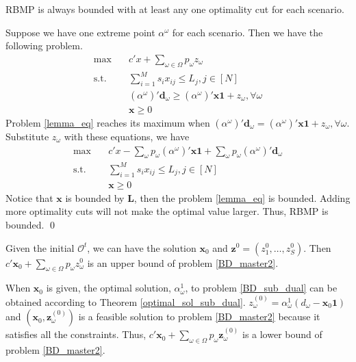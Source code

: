 \begin{lem}\label{one_ep_feasible}
RBMP is always bounded with at least any one optimality cut for each scenario.
\end{lem}

\begin{pf}
  Suppose we have one extreme point $\alpha^{\omega}$ for each scenario. Then we have the following problem.
  \begin{equation}\label{lemma_eq}
    \begin{aligned}
      \max \quad & c{'} x + \sum_{\omega \in \Omega} p_{\omega} z_{\omega} \\
      \text {s.t.} \quad & \sum_{i=1}^{M} s_{i} x_{ij} \leq L_j, j \in [N] \\
      & (\alpha^{\omega}){'}\mathbf{d}_{\omega} \geq (\alpha^{\omega}){'} \mathbf{x} \mathbf{1} + z_{\omega}, \forall \omega \\
       & \mathbf{x} \geq 0
    \end{aligned}
  \end{equation}
  Problem \eqref{lemma_eq} reaches its maximum when $(\alpha^{\omega}){'}\mathbf{d}_{\omega} = (\alpha^{\omega}){'} \mathbf{x} \mathbf{1} + z_{\omega}, \forall \omega$. Substitute $z_{\omega}$ with these equations, we have 
  \begin{equation}\label{lemma_eq2}
    \begin{aligned}
      \max \quad & c{'} x - \sum_{\omega}p_{\omega}(\alpha^{\omega}){'} \mathbf{x} \mathbf{1} + \sum_{\omega} p_{\omega} (\alpha^{\omega}){'} \mathbf{d}_{\omega} \\
      \text {s.t.} \quad & \sum_{i=1}^{M} s_{i} x_{ij} \leq L_j, j \in [N] \\
      & \mathbf{x} \geq 0
    \end{aligned}
  \end{equation}
  Notice that $\mathbf{x}$ is bounded by $\mathbf{L}$, then the problem \eqref{lemma_eq} is bounded. Adding more optimality cuts will not make the optimal value larger. Thus, RBMP is bounded. 
  \qed
\end{pf}

Given the initial $\mathcal{O}^{t}$, we can have the solution $\mathbf{x}_{0}$ and $\mathbf{z}^{0} =(z^{0}_1,\ldots, z^{0}_S)$. Then $c{'} \mathbf{x}_0 + \sum_{\omega \in \Omega} p_{\omega} z_{\omega}^{0}$ is an upper bound of problem \eqref{BD_master2}. 


When $\mathbf{x}_0$ is given, the optimal solution, $\alpha_{\omega}^{1}$, to problem \eqref{BD_sub_dual} can be obtained according to Theorem \ref{optimal_sol_sub_dual}. $z_{\omega}^{(0)} = \alpha_{\omega}^{1}(d_{\omega} - \mathbf{x}_0 \mathbf{1})$ and $(\mathbf{x}_0, \mathbf{z}_{\omega}^{(0)})$ is a feasible solution to problem \eqref{BD_master2} because it satisfies all the constraints. Thus, $c{'} \mathbf{x}_0 + \sum_{\omega \in \Omega} p_{\omega} \mathbf{z}_{\omega}^{(0)}$ is a lower bound of problem \eqref{BD_master2}.

